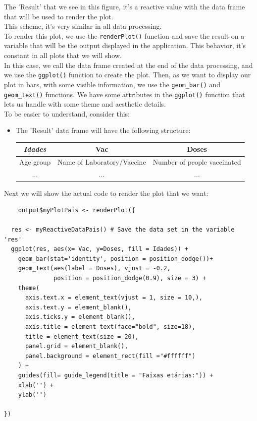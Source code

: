 The 'Result' that we see in this figure, it's a reactive value with the data frame that will be used to render the plot.\\ This scheme, it's very similar in all data processing.\\

To render this plot, we use the \texttt{renderPlot()} function and save the result on a variable that will be the output displayed in the application. This behavior, it's constant in all plots that we will show.\\
In this case, we call the data frame created at the end of the data processing, and we use the \texttt{ggplot()} function to create the plot. Then, as we want to display our plot in bars, with some visible information, we use the \texttt{geom\_bar()} and \texttt{geom\_text()} functions. We have some attributes in the \texttt{ggplot()} function that lets us handle with some theme and aesthetic details.
\\ To be easier to understand, consider this:
\begin{itemize}
    \item The 'Result' data frame will have the following structure:
    \begin{center}
        \begin{tabular}{ |c|c|c| } 
             \hline
             \textbf{\textit{Idades}} & \textbf{Vac} & \textbf{Doses} \\ \hline
             Age group & Name of Laboratory/Vaccine & Number of people vaccinated \\  
             ... & ... & ...\\
             \hline
        \end{tabular}
    \end{center}
\end{itemize} 

Next we will show the actual code to render the plot that we want:\\

\begin{verbatim}
    output$myPlotPais <- renderPlot({
  
  res <- myReactiveDataPais() # Save the data set in the variable 'res'
  ggplot(res, aes(x= Vac, y=Doses, fill = Idades)) + 
    geom_bar(stat='identity', position = position_dodge())+
    geom_text(aes(label = Doses), vjust = -0.2,
              position = position_dodge(0.9), size = 3) +
    theme(
      axis.text.x = element_text(vjust = 1, size = 10,),
      axis.text.y = element_blank(),
      axis.ticks.y = element_blank(),
      axis.title = element_text(face="bold", size=18),
      title = element_text(size = 20),
      panel.grid = element_blank(),
      panel.background = element_rect(fill ="#ffffff")
    ) + 
    guides(fill= guide_legend(title = "Faixas etárias:")) +
    xlab('') + 
    ylab('') 
  
})
\end{verbatim}

